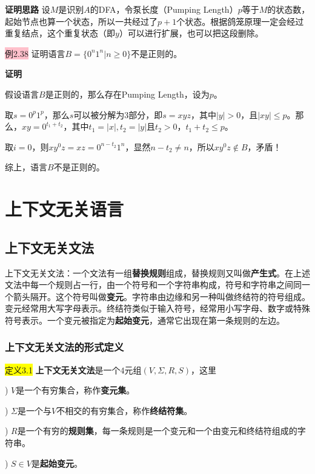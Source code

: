 \documentclass[a4paper]{article}
\begin{document}
	\textbf{证明思路} \quad 设$M$是识别$A$的DFA，令泵长度（Pumping Length）$p$等于$M$的状态数，起始节点也算一个状态，所以一共经过了$p+1$个状态。根据鸽笼原理一定会经过重复结点，这个重复状态（即$y$）可以进行扩展，也可以把这段删除。
	
	\colorbox{pink}{例2.38} 证明语言$B=\{0^n1^n|n \geq 0\}$不是正则的。
	
	\textbf{证明}
	
	假设语言$B$是正则的，那么存在Pumping Length，设为$p$。
	
	取$s=0^p1^p$，那么$s$可以被分解为$3$部分，即$s=xyz$，其中$|y|>0$，且$|xy| \leq p$。那么，$xy=0^{t_1+t_2}$，其中$t_1=|x|,t_2=|y|$且$t_2>0，t_1+t_2 \leq p$。
	
	取$i=0$，则$xy^0z=xz=0^{n-t_2}1^n$，显然$n-t_2 \neq n$，所以$xy^0z \notin B$，矛盾！
	
	综上，语言$B$不是正则的。

\section{上下文无关语言}

\subsection{上下文无关文法}

	上下文无关文法：一个文法有一组\textbf{替换规则}组成，替换规则又叫做\textbf{产生式}。在上述文法中每一个规则占一行，由一个符号和一个字符串构成，符号和字符串之间同一个箭头隔开。这个符号叫做\textbf{变元}。字符串由边缘和另一种叫做终结符的符号组成。变元经常用大写字母表示。终结符类似于输入符号，经常用小写字母、数字或特殊符号表示。一个变元被指定为\textbf{起始变元}，通常它出现在第一条规则的左边。

\subsubsection{上下文无关文法的形式定义}

	\colorbox{yellow}{定义3.1} \textbf{上下文无关文法}是一个$4$元组$(V, \Sigma, R, S)$，这里
	
	) $V$是一个有穷集合，称作\textbf{变元集}。
	
	) $\Sigma$是一个与$V$不相交的有穷集合，称作\textbf{终结符集}。
	
	) $R$是一个有穷的\textbf{规则集}，每一条规则是一个变元和一个由变元和终结符组成的字符串。
	
	) $S \in V$是\textbf{起始变元}。
\end{document}
